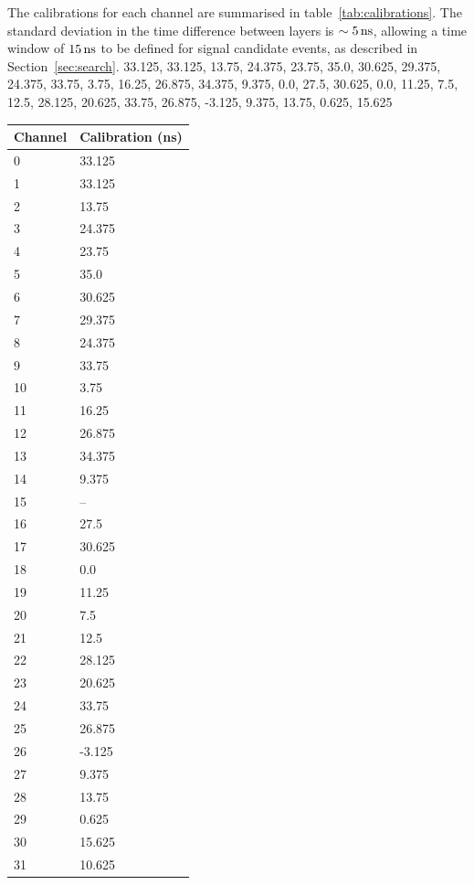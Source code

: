 \documentclass[12pt]{article}
\newcommand{\unit}[1]{\ensuremath{\text{\,#1}}\xspace}
\begin{document}
The calibrations for each channel are summarised in table~\ref{tab:calibrations}. The 
standard deviation in the time difference between layers is $\sim5\unit{ns}$, allowing 
a time window of $15\unit{ns}$ to be defined for signal candidate events, as described in 
Section~\ref{sec:search}.
33.125, 33.125, 13.75, 24.375, 23.75, 35.0, 30.625, 29.375, 24.375, 33.75, 3.75, 16.25, 26.875, 34.375, 9.375, 0.0, 27.5, 30.625, 0.0, 11.25, 7.5, 12.5, 28.125,      20.625, 33.75, 26.875, -3.125, 9.375, 13.75, 0.625, 15.625
\begin{table}[ht!]
    \centering
    \scriptsize
	\begin{tabular}{ll}
	    Channel & Calibration (ns) \\ 
	    \hline
	    0 &  33.125   \\
	    1 &  33.125  \\
	    2 &  13.75   \\ 
	    3 &  24.375  \\
	    4 &  23.75   \\
	    5 &  35.0    \\
	    6 &  30.625  \\
	    7 &  29.375  \\
	    8 &  24.375  \\
	    9 &  33.75   \\
	    10 & 3.75    \\
	    11 & 16.25   \\
	    12 & 26.875  \\  
	    13 & 34.375  \\
	    14 & 9.375   \\
	    15 & --     \\
	    16 & 27.5    \\
	    17 & 30.625  \\
	    18 & 0.0     \\
	    19 & 11.25   \\
	    20 & 7.5     \\
	    21 & 12.5    \\
	    22 & 28.125  \\
	    23 & 20.625  \\
	    24 & 33.75   \\
	    25 & 26.875  \\
	    26 & -3.125  \\
	    27 & 9.375   \\
	    28 & 13.75   \\
	    29 & 0.625   \\
	    30 & 15.625  \\
	    31 & 10.625     \\ 
	\end{tabular}
\end{table}
\end{document}
